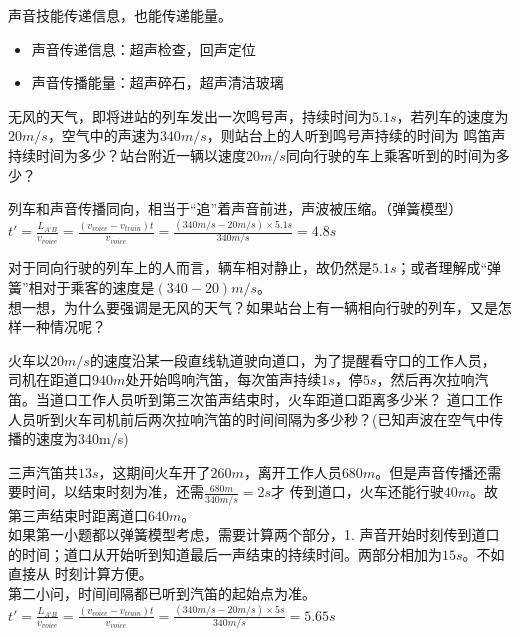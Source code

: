 \documentclass[windows,csize4, answers]{BHCexam}
\begin{document}
\begin{groups}
    声音技能传递信息，也能传递能量。
    \begin{itemize}
        \item 声音传递信息：超声检查，回声定位
        \item 声音传播能量：超声碎石，超声清洁玻璃
    \end{itemize}


    \begin{questions}[]
        \question[5]无风的天气，即将进站的列车发出一次鸣号声，持续时间为$5.1s$，若列车的速度为$20m/s$，空气中的声速为$340m/s$，则站台上的人听到鸣号声持续的时间为
        鸣笛声持续时间为多少？站台附近一辆以速度$20m/s$同向行驶的车上乘客听到的时间为多少？
        \begin{solution}{0.5cm}
            \methodonly 列车和声音传播同向，相当于“追”着声音前进，声波被压缩。（弹簧模型）\\
            $t'=\frac{L_{A'B}}{v_{voice}}=\frac{(v_{voice}-v_{train})t}{v_{voice}}=\frac{(340m/s-20m/s)\times 5.1s}{340m/s}=4.8s$

            对于同向行驶的列车上的人而言，辆车相对静止，故仍然是$5.1s$；或者理解成“弹簧”相对于乘客的速度是$(340-20)m/s$。\\
            想一想，为什么要强调是无风的天气？如果站台上有一辆相向行驶的列车，又是怎样一种情况呢？
        \end{solution}
        \vspace{3.5cm}

        \question[5]火车以$20m/s$的速度沿某一段直线轨道驶向道口，为了提醒看守口的工作人员，
        司机在距道口$940m$处开始鸣响汽笛，每次笛声持续$1s$，停$5s$，然后再次拉响汽笛。当道口工作人员听到第三次笛声结束时，火车距道口距离多少米？
        道口工作人员听到火车司机前后两次拉响汽笛的时间间隔为多少秒？(已知声波在空气中传播的速度为340m/s)
        \begin{solution}{0.5cm}
            \methodonly 三声汽笛共$13s$，这期间火车开了$260m$，离开工作人员$680m$。但是声音传播还需要时间，以结束时刻为准，还需$\frac{680m}{340m/s}=2s$才
            传到道口，火车还能行驶$40m$。故第三声结束时距离道口$640m$。\\
            如果第一小题都以弹簧模型考虑，需要计算两个部分，1. 声音开始时刻传到道口的时间；道口从开始听到知道最后一声结束的持续时间。两部分相加为$15s$。不如直接从
            时刻计算方便。\\
            第二小问，时间间隔都已听到汽笛的起始点为准。
            $t'=\frac{L_{A'B}}{v_{voice}}=\frac{(v_{voice}-v_{train})t}{v_{voice}}=\frac{(340m/s-20m/s)\times 5s}{340m/s}=5.65s$
        \end{solution}
        \vspace{3.5cm}


\end{questions}
\end{groups}
\end{document}
